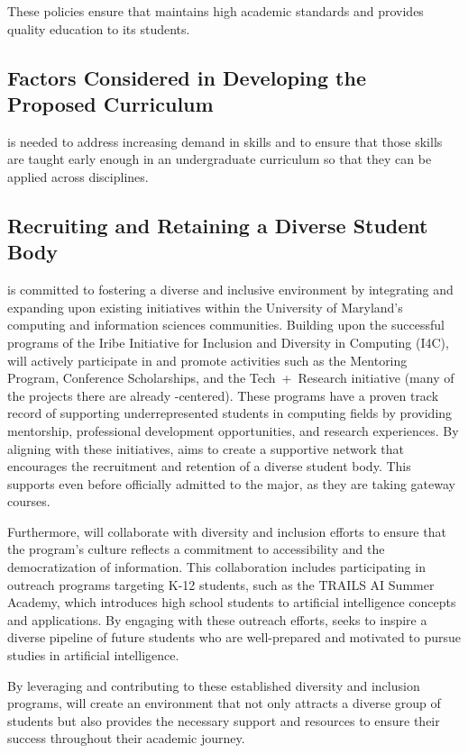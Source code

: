 These policies ensure that \short{} maintains high academic standards and provides quality education to its students.

\subsection{Factors Considered in Developing the Proposed Curriculum}

\name{} is needed to address increasing demand in \ai{} skills and to ensure that those skills are taught early enough in an undergraduate curriculum so that they can be applied across disciplines.

\subsection{Recruiting and Retaining a Diverse Student Body}

\name{} is committed to fostering a diverse and inclusive environment by integrating and expanding upon existing initiatives within the University of Maryland's computing and information sciences communities. Building upon the successful programs of the Iribe Initiative for Inclusion and Diversity in Computing (I4C), \short{} will actively participate in and promote activities such as the Mentoring Program, Conference Scholarships, and the Tech~+~Research initiative (many of the projects there are already \ai{}-centered). These programs have a proven track record of supporting underrepresented students in computing fields by providing mentorship, professional development opportunities, and research experiences. By aligning with these initiatives, \short{} aims to create a supportive network that encourages the recruitment and retention of a diverse student body.
%
This supports even before officially admitted to the major, as they are taking gateway courses.

Furthermore, \short{} will collaborate with diversity and inclusion efforts to ensure that the program's culture reflects a commitment to accessibility and the democratization of information. This collaboration includes participating in outreach programs targeting K-12 students, such as the TRAILS AI Summer Academy, which introduces high school students to artificial intelligence concepts and applications. By engaging with these outreach efforts, \short{} seeks to inspire a diverse pipeline of future students who are well-prepared and motivated to pursue studies in artificial intelligence. 

By leveraging and contributing to these established diversity and inclusion programs, \short{} will create an environment that not only attracts a diverse group of students but also provides the necessary support and resources to ensure their success throughout their academic journey.
